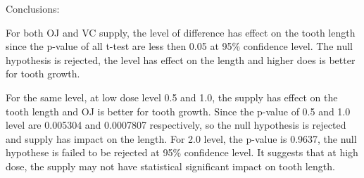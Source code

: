 \documentclass[
]{article}
\begin{document}
Conclusions:

For both OJ and VC supply, the level of difference has effect on the
tooth length since the p-value of all t-test are less then 0.05 at 95\%
confidence level. The null hypothesis is rejected, the level has effect
on the length and higher does is better for tooth growth.

For the same level, at low dose level 0.5 and 1.0, the supply has effect
on the tooth length and OJ is better for tooth growth. Since the p-value
of 0.5 and 1.0 level are 0.005304 and 0.0007807 respectively, so the
null hypothesis is rejected and supply has impact on the length. For 2.0
level, the p-value is 0.9637, the null hypothese is failed to be
rejected at 95\% confidence level. It suggests that at high dose, the
supply may not have statistical significant impact on tooth length.
\end{document}
